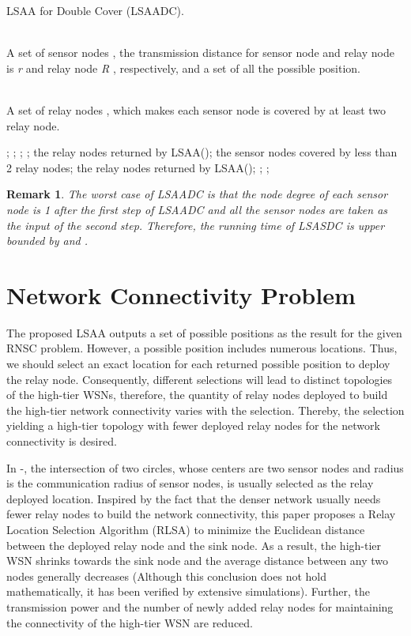 \documentclass[journal]{IEEEtran}
\newtheorem{remark}{Remark}
\begin{document}
\begin{algorithm}[htb]         \caption{LSAA for Double Cover (LSAADC).}             
\label{LSAADC}                  
\begin{algorithmic}[1]                
\REQUIRE ~~\\                          A set of sensor nodes , the transmission distance for sensor node and relay node is \emph{r} and relay node \emph{R}  , respectively, and a set  of all the possible position.

\ENSURE ~~\\                           A set of relay nodes , which makes each sensor node is covered by at least two relay node.

\STATE ;
\STATE ;
\STATE ;
\STATE ;
\STATE the relay nodes returned by LSAA();
\STATE the sensor nodes covered by less than 2 relay nodes;
\STATE the relay nodes returned by LSAA();
\STATE ;
\RETURN ;                
\end{algorithmic}

\end{algorithm}

\begin{remark} The worst case of LSAADC is that the node degree of each sensor node is 1 after the first step of LSAADC and all the sensor nodes are taken as the input of the second step. Therefore, the running time of LSASDC  is upper bounded by  and .
\end{remark}
\section{Network Connectivity Problem}
The proposed LSAA outputs a set of possible positions as the result for the given RNSC problem. However, a possible position includes numerous locations. Thus,
we should select an exact location for each returned possible position to deploy the relay node. Consequently, different selections will lead to distinct topologies of the high-tier WSNs, therefore, the quantity of relay nodes deployed to build the high-tier network connectivity varies with the selection. Thereby, the selection yielding a high-tier topology with fewer deployed relay nodes for the network connectivity is desired.

In \cite{Tang06} \cite{Ali11}-\cite{Dandekar12}, the intersection of two circles, whose centers are two sensor nodes and
radius is the communication radius of sensor nodes, is usually selected as the relay deployed location. Inspired by the fact that the denser network usually needs fewer relay nodes to build the network connectivity, this paper proposes a Relay Location Selection Algorithm (RLSA) to minimize the Euclidean distance between the deployed relay node and the sink node.  As a result, the high-tier WSN shrinks towards the sink node and the average distance between any two nodes generally decreases (Although this conclusion does not hold mathematically, it has been verified by extensive simulations). Further, the transmission power and the number of newly added relay nodes for maintaining the connectivity of the high-tier WSN are reduced.
\end{document}
